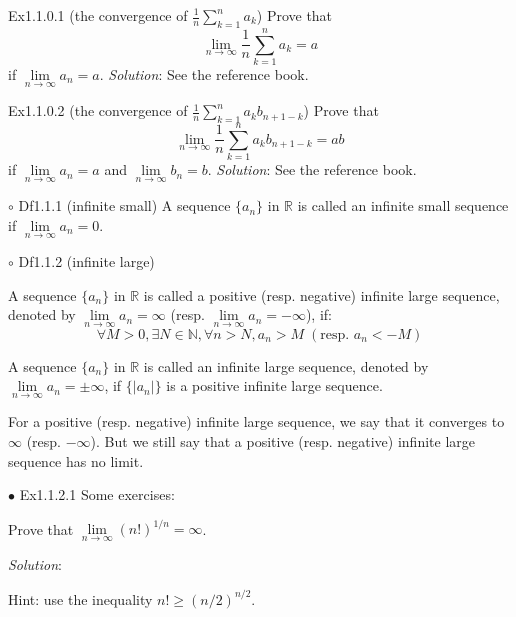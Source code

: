 \documentclass{article}
\begin{document}
\begin{Th}{Ex1.1.0.1 (the convergence of $\frac{1}{n}\sum_{k=1}^{n} a_k$)}
    Prove that 
    $$\lim\limits_{n\to\infty}\frac{1}{n}\sum_{k=1}^{n} a_k = a$$
    if $\lim\limits_{n\to\infty}a_n=a$.
    \tcblower
    \textit{Solution}: See the reference book.
\end{Th}

\begin{Th}{Ex1.1.0.2 (the convergence of $\frac{1}{n}\sum_{k=1}^{n} a_k b_{n+1-k}$)}
    Prove that 
    $$\lim\limits_{n\to\infty}\frac{1}{n}\sum_{k=1}^{n} a_k b_{n+1-k} = a b$$
    if $\lim\limits_{n\to\infty}a_n=a$ and $\lim\limits_{n\to\infty}b_n=b$.
    \tcblower
    \textit{Solution}: See the reference book.
\end{Th}

\begin{Df}{$\circ$ Df1.1.1 (infinite small)}
    A sequence $\{a_n\}$ in $\mathbb{R}$ is called an infinite small sequence if $\lim\limits_{n\to\infty}a_n=0$.
\end{Df}

\begin{Df}{$\circ$ Df1.1.2 (infinite large)}
    \begin{compactenum}
        \item A sequence $\{a_n\}$ in $\mathbb{R}$ is called a positive (resp. negative) infinite large sequence, denoted by $\lim\limits_{n\to\infty}a_n=\infty$ (resp. $\lim\limits_{n\to\infty}a_n=-\infty$), if:
        $$\forall M>0, \exists N\in\mathbb{N}, \forall n > N, a_n>M \;(\text{resp. } a_n<-M)$$
        \item A sequence $\{a_n\}$ in $\mathbb{R}$ is called an infinite large sequence, denoted by $\lim\limits_{n\to\infty}a_n=\pm\infty$, if $\{|a_n|\}$ is a positive infinite large sequence.
    \end{compactenum}
\end{Df}

\begin{Rmk}{}
    For a positive (resp. negative) infinite large sequence, we say that it converges to $\infty$ (resp. $-\infty$). But we still say that a positive (resp. negative) infinite large sequence has no limit.
\end{Rmk}

\begin{Th}{$\bullet$ Ex1.1.2.1}
    Some exercises:
    \begin{compactenum}
        \item Prove that $\lim\limits_{n\to\infty} (n!)^{1/n} = \infty$.
    \end{compactenum}
    \tcblower
    \textit{Solution}: 
    \begin{compactenum}
        \item Hint: use the inequality $n!\geq (n/2)^{n/2}$.
    \end{compactenum}
\end{Th}
\end{document}
